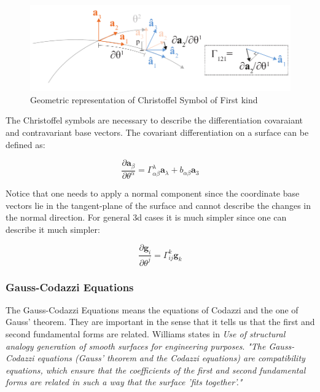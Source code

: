 \begin{figure}[H]
\centering
\includegraphics[width=0.9\linewidth ]{figure/Theory/christoffelFirstKind.pdf}
\caption{Geometric representation of Christoffel Symbol of First kind }
\end{figure}

The Christoffel symbols are necessary to describe the differentiation covaraiant and contravariant base vectors. The covariant differentiation on a surface can be defined as:

\begin{equation}
    \frac{\partial\textbf{a}_\beta}{\partial\theta^\alpha} = \Gamma^\lambda_{\alpha \beta} \textbf{a}_\lambda + b_{\alpha \beta}\textbf{a}_3
\end{equation}

Notice that one needs to apply a normal component since the coordinate base vectors lie in the tangent-plane of the surface and cannot describe the changes in the normal direction. For general 3d cases it is much simpler since one can describe it much simpler:


\begin{equation}
 \frac{\partial\textbf{g}_i}{\partial\theta^j} = \Gamma^k_{i j} \textbf{g}_k 
\end{equation}






\subsubsection{Gauss-Codazzi Equations}

The Gauss-Codazzi Equations means the equations of Codazzi and the one of Gauss' theorem. They are important in the sense that it tells us that the first and second fundamental forms are related.   Williams states in \textit{Use of structural analogy generation of smooth surfaces for engineering
purposes}\cite{ref:Williams2}. \textit{ "The Gauss-Codazzi equations (Gauss' theorem and the
Codazzi equations) are compatibility equations, which
ensure that the coefficients of the first and second fundamental
forms are related in such a way that the surface
'fits together'."} 




